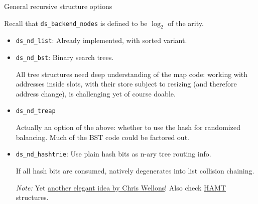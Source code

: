 \begin{frame}[fragile]{General recursive structure options}

  Recall that \lstinline{ds_backend_nodes} is defined to be $\log_2$ of the arity.
  
  \begin{itemize}
  \item \lstinline{ds_nd_list}: Already implemented, with sorted variant.

  \item \lstinline{ds_nd_bst}: Binary search trees.

    All tree structures need deep understanding of the map code: working with addresses inside slots, with their store subject to resizing (and therefore address change), is challenging yet of course doable.
    
  \item \lstinline{ds_nd_treap}

    Actually an option of the above: whether to use the hash for randomized balancing. Much of the BST code could be factored out.

  \item \lstinline{ds_nd_hashtrie}: Use plain hash bits as n-ary tree routing info.

    If all hash bits are consumed, natively degenerates into list collision chaining.

    {\em Note:} Yet \href{https://nullprogram.com/blog/2023/09/30/}{another elegant idea by Chris Wellons}! Also check \href{https://en.wikipedia.org/wiki/Hash_array_mapped_trie}{HAMT} structures.
  \end{itemize}

\end{frame}



